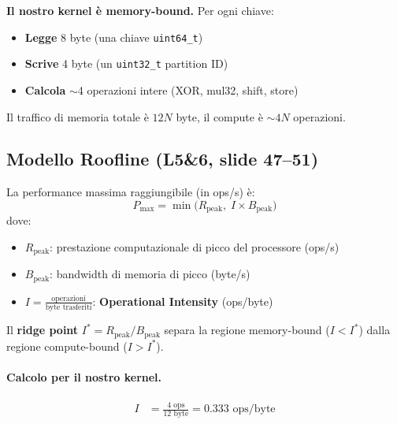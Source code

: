 \documentclass[11pt,a4paper]{article}
\begin{document}
\textbf{Il nostro kernel è memory-bound.} Per ogni chiave:
\begin{itemize}
    \item \textbf{Legge} 8 byte (una chiave \texttt{uint64\_t})
    \item \textbf{Scrive} 4 byte (un \texttt{uint32\_t} partition ID)
    \item \textbf{Calcola} $\sim$4 operazioni intere (XOR, mul32, shift, store)
\end{itemize}
Il traffico di memoria totale è $12N$ byte, il compute è $\sim 4N$ operazioni.


\subsection{Modello Roofline (L5\&6, slide 47--51)}

\begin{theorybox}[title=\textbf{Modello Roofline}]
La performance massima raggiungibile (in ops/s) è:
$$P_\text{max} = \min\bigl(R_\text{peak},\; I \times B_\text{peak}\bigr)$$
dove:
\begin{itemize}
    \item $R_\text{peak}$: prestazione computazionale di picco del processore (ops/s)
    \item $B_\text{peak}$: bandwidth di memoria di picco (byte/s)
    \item $I = \frac{\text{operazioni}}{\text{byte trasferiti}}$: \textbf{Operational Intensity} (ops/byte)
\end{itemize}
Il \textbf{ridge point} $I^* = R_\text{peak} / B_\text{peak}$ separa la regione memory-bound ($I < I^*$) dalla regione compute-bound ($I > I^*$).
\end{theorybox}

\paragraph{Calcolo per il nostro kernel.}
\begin{align}
I &= \frac{4 \text{ ops}}{12 \text{ byte}} = 0.333 \text{ ops/byte} \label{eq:oi}
\end{align}
\end{document}
